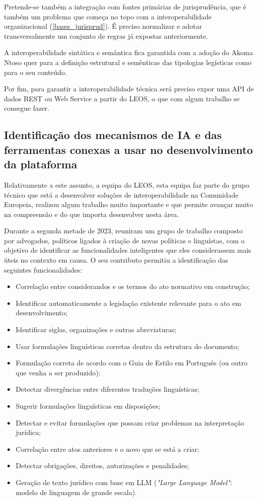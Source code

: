 Pretende-se também a integração com fontes primárias de jurisprudência, que é também um problema 
que começa no topo com a interoperabilidade organizacional (\ref{bases_jurisprud}). É preciso normalizar 
e adotar transversalmente um conjunto de regras já expostas anteriormente.

A interoperabilidade sintática e semântica fica garantida com a adoção do Akoma Ntoso \cite{AkomaNtoso2018} 
quer para a definição estrutural e semênticas das tipologias legísticas como para o seu conteúdo.

Por fim, para garantir a interoperabilidade técnica será preciso expor uma API de dados REST ou Web
Service a partir do LEOS, o que com algum trabalho se consegue fazer.


\subsection{Identificação dos mecanismos de IA e das ferramentas conexas a usar no desenvolvimento
da plataforma}

Relativamente a este assunto, a equipa do LEOS, esta equipa faz parte do grupo técnico que está a 
desenvolver soluções de interoperabilidade na Comunidade Europeia, realizou algum trabalho muito 
importante e que permite avançar muito na compreensão e do que importa desenvolver nesta área.

Durante a segunda metade de 2023, reuniram um grupo de trabalho composto por advogados, 
políticos ligados à criação de novas políticas e linguístas, com o objetivo de identificar 
as funcionalidades inteligentes que eles considerassem mais úteis no contexto em causa.
O seu contributo permitiu a identificação das seguintes funcionalidades:

\begin{itemize}
    \item Correlação entre considerandos e os termos do ato normativo em construção;
    \item Identificar automaticamente a legislação existente relevante para o ato em desenvolvimento;
    \item Identificar siglas, organizações e outras abreviaturas;
    \item Usar formulações linguísticas corretas dentro da estrutura do documento;
    \item Formulação correta de acordo com o Guia de Estilo em Português (ou outro que venha a ser produzido);
    \item Detectar divergências entre diferentes traduções linguísticas;
    \item Sugerir formulações linguísticas em disposições;
    \item Detectar e evitar formulações que possam criar problemas na interpretação jurídica;
    \item Correlação entre atos anteriores e o novo que se está a criar;
    \item Detectar obrigações, direitos, autorizações e  penalidades;
    \item Geração de texto jurídico com base em LLM (\emph{"Large Language Model"}: modelo de linguagem de grande escala).
\end{itemize}

